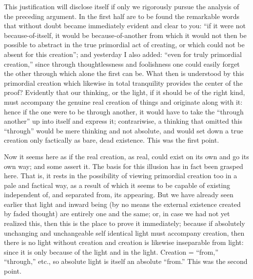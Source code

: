 This justification will disclose itself
if only we rigorously pursue the
analysis of the preceding argument.
In the first half are to be found
the remarkable words that without doubt
became immediately evident and clear to you:
“if it were not because-of-itself,
it would be because-of-another
from which it would not then be possible
to abstract in the true primordial act of creating,
or which could not be absent for this creation”;
and yesterday I also added:
“even for truly primordial creation,”
since through thoughtlessness and foolishness
one could easily forget the other through
which alone the first can be.
What then is understood by this primordial creation
which likewise in total tranquility
provides the center of the proof?
Evidently that our thinking, or the light,
if it should be of the right kind,
must accompany the genuine real creation of things
and originate along with it:
hence if the one were to be through another,
it would have to take the “through another”
up into itself and express it;
contrariwise, a thinking that omitted this “through”
would be mere thinking and not absolute,
and would set down a true creation
only factically as bare, dead existence.
This was the first point.

Now it seems here as if the real creation, as real,
could exist on its own and go its own way; and some assert it.
The basis for this illusion has in fact been grasped here.
That is, it rests in the possibility of viewing
primordial creation too in a pale and factical way,
as a result of which it seems to be capable of
existing independent of, and separated from, its appearing.
But we have already seen earlier that light and inward being
(by no means the external existence created by faded thought)
are entirely one and the same;
or, in case we had not yet realized this,
then this is the place to prove it immediately;
because if absolutely unchanging and unchangeable
self identical light must accompany creation,
then there is no light without creation
and creation is likewise inseparable from light:
since it is only because of the light and in the light.
Creation = “from,” “through,” etc.,
so absolute light is itself an absolute “from.”
This was the second point.

